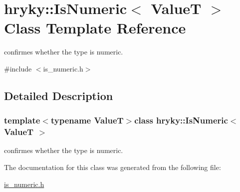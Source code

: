 \hypertarget{classhryky_1_1_is_numeric}{\section{hryky\-:\-:Is\-Numeric$<$ Value\-T $>$ Class Template Reference}
\label{classhryky_1_1_is_numeric}
}


confirmes whether the type is numeric.  




{\ttfamily \#include $<$is\-\_\-numeric.\-h$>$}



\subsection{Detailed Description}
\subsubsection*{template$<$typename Value\-T$>$class hryky\-::\-Is\-Numeric$<$ Value\-T $>$}

confirmes whether the type is numeric. 

The documentation for this class was generated from the following file\-:\begin{DoxyCompactItemize}
\item 
\hyperlink{is__numeric_8h}{is\-\_\-numeric.\-h}\end{DoxyCompactItemize}
